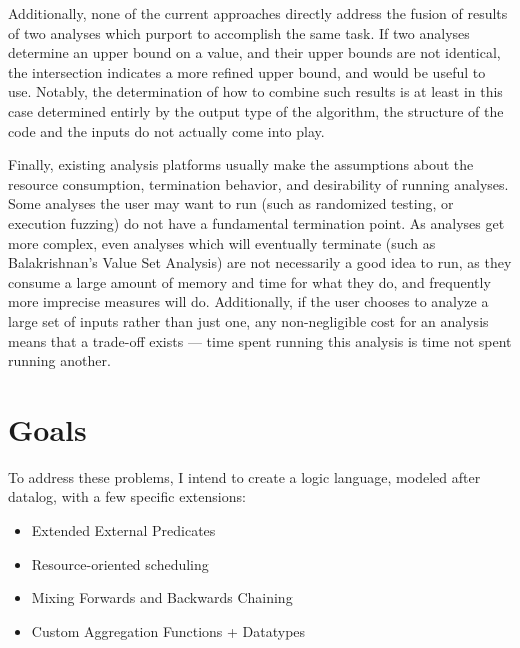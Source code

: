 \documentclass{article}
\begin{document}
Additionally, none of the current approaches directly address the fusion of results of two analyses which purport to accomplish the same task.
If two analyses determine an upper bound on a value, and their upper bounds are not identical, the intersection indicates a more refined upper bound, and would be useful to use.
Notably, the determination of how to combine such results is at least in this case determined entirly by the output type of the algorithm, the structure of the code and the inputs do not actually come into play.

Finally, existing analysis platforms usually make the assumptions about the resource consumption, termination behavior, and desirability of running analyses.
Some analyses the user may want to run (such as randomized testing, or execution fuzzing) do not have a fundamental termination point.
As analyses get more complex, even analyses which will eventually terminate (such as Balakrishnan's Value Set Analysis) are not necessarily a good idea to run, as they consume a large amount of memory and time for what they do, and frequently more imprecise measures will do.
Additionally, if the user chooses to analyze a large set of inputs rather than just one, any non-negligible cost for an analysis means that a trade-off exists --- time spent running this analysis is time not spent running another.

\section{Goals}
To address these problems, I intend to create a logic language, modeled after datalog, with a few specific extensions:
\begin{itemize}
\item Extended External Predicates
\item Resource-oriented scheduling
\item Mixing Forwards and Backwards Chaining
\item Custom Aggregation Functions + Datatypes
\end{itemize}
\end{document}
